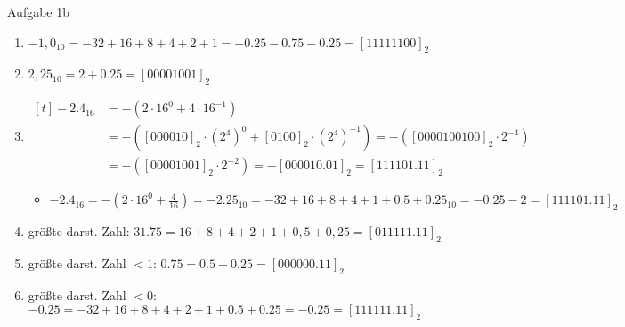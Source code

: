 \begin{frame}{Aufgabe 1b}

  \begin{solutionnoinc}
\begin{enumerate}
  \item $-1,0_{10} = -32+16+8+4+2+1 = -0.25 - 0.75 - 0.25 = [11111100]_2$
  \item $2,25_{10} = 2+0.25 = [00001001]_2$
        \item $\begin{aligned}[t]
        -2.4_{16} &= -(2 \cdot 16^0 + 4 \cdot 16^{-1}) \\
                  &= -([000010]_2 \cdot (2^4)^0 + [0100]_2 \cdot (2^4)^{-1}) = -([0000100100]_2 \cdot 2^{-4}) \\
                  &= -([00001001]_2 \cdot 2^{-2}) = -[000010.01]_2 = [111101.11]_2
        \end{aligned}$
        \begin{itemize}
          \item $-2.4_{16}= -(2 \cdot 16^{0} + \frac{4}{16}) = -2.25_{10}=-32+16+8+4+1+0.5+0.25_{10} = -0.25 - 2 =[111101.11]_2$
        \end{itemize}
        \item größte darst. Zahl: $31.75 = 16+8+4+2+1+0,5+0,25 = [011111.11]_2$
        \item größte darst. Zahl $ < 1$: $0.75 = 0.5 + 0.25 = [000000.11]_2$
        \item größte darst. Zahl $ < 0$: $-0.25 = -32 + 16 + 8 + 4 + 2 + 1 + 0.5 + 0.25 = -0.25 =  [111111.11]_2$
    \end{enumerate}
  \end{solutionnoinc}



\end{frame}
